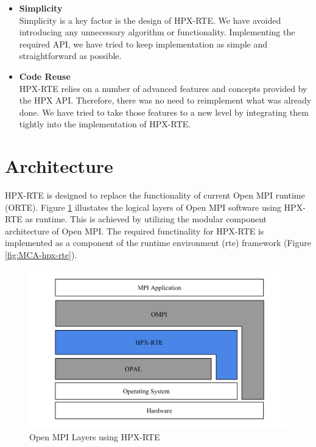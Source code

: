 \begin{itemize}
\item \textbf{Simplicity}\\
  Simplicity is a key factor is the design of HPX-RTE. We have avoided introducing any unnecessary algorithm or functionality. Implementing the required API, we have tried to keep implementation as simple and straightforward as possible.

\item \textbf{Code Reuse}\\
  HPX-RTE relies on a number of advanced features and concepts provided by the HPX API. Therefore, there was no need to reimplement what was already done. We have tried to take those features to a new level by integrating them tightly into the implementation of HPX-RTE.

\end{itemize}

\section{Architecture}
\label{sec:architecture}

HPX-RTE is designed to replace the functionality of current Open MPI runtime (ORTE). Figure \ref{fig:open-mpi-layers-hpx-rte} illustates the logical layers of Open MPI software using HPX-RTE as runtime. This is achieved by utilizing the modular component architecture of Open MPI. The required functinality for HPX-RTE is implemented as a component of the runtime environment (rte) framework (Figure \ref{fig:MCA-hpx-rte}).

\begin{figure}[ht]
\centering
\includegraphics[scale=0.45]{images/open-mpi-layers-hpx-rte.png}
\caption[Open MPI Layers using HPX-RTE]{Open MPI Layers using HPX-RTE}
\label{fig:open-mpi-layers-hpx-rte}
\end{figure}

